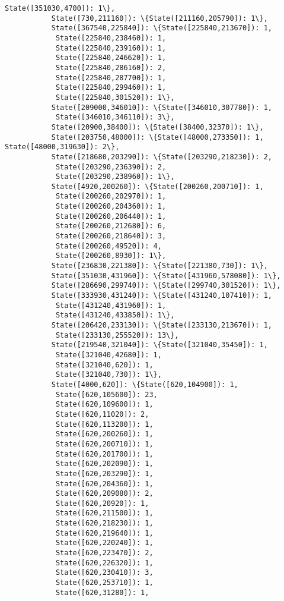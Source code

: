 \documentclass[11pt]{article}
\begin{document}
\begin{Verbatim}[commandchars=\\\{\}]
            State([351030,4700]): 1\},
           State([730,211160]): \{State([211160,205790]): 1\},
           State([367540,225840]): \{State([225840,213670]): 1,
            State([225840,238460]): 1,
            State([225840,239160]): 1,
            State([225840,246620]): 1,
            State([225840,286160]): 2,
            State([225840,287700]): 1,
            State([225840,299460]): 1,
            State([225840,301520]): 1\},
           State([209000,346010]): \{State([346010,307780]): 1,
            State([346010,346110]): 3\},
           State([20900,38400]): \{State([38400,32370]): 1\},
           State([203750,48000]): \{State([48000,273350]): 1, State([48000,319630]): 2\},
           State([218680,203290]): \{State([203290,218230]): 2,
            State([203290,236390]): 2,
            State([203290,238960]): 1\},
           State([4920,200260]): \{State([200260,200710]): 1,
            State([200260,202970]): 1,
            State([200260,204360]): 1,
            State([200260,206440]): 1,
            State([200260,212680]): 6,
            State([200260,218640]): 3,
            State([200260,49520]): 4,
            State([200260,8930]): 1\},
           State([236830,221380]): \{State([221380,730]): 1\},
           State([351030,431960]): \{State([431960,578080]): 1\},
           State([286690,299740]): \{State([299740,301520]): 1\},
           State([333930,431240]): \{State([431240,107410]): 1,
            State([431240,431960]): 1,
            State([431240,433850]): 1\},
           State([206420,233130]): \{State([233130,213670]): 1,
            State([233130,255520]): 13\},
           State([219540,321040]): \{State([321040,35450]): 1,
            State([321040,42680]): 1,
            State([321040,620]): 1,
            State([321040,730]): 1\},
           State([4000,620]): \{State([620,104900]): 1,
            State([620,105600]): 23,
            State([620,109600]): 1,
            State([620,11020]): 2,
            State([620,113200]): 1,
            State([620,200260]): 1,
            State([620,200710]): 1,
            State([620,201700]): 1,
            State([620,202090]): 1,
            State([620,203290]): 1,
            State([620,204360]): 1,
            State([620,209080]): 2,
            State([620,20920]): 1,
            State([620,211500]): 1,
            State([620,218230]): 1,
            State([620,219640]): 1,
            State([620,220240]): 1,
            State([620,223470]): 2,
            State([620,226320]): 1,
            State([620,230410]): 3,
            State([620,253710]): 1,
            State([620,31280]): 1,

\end{Verbatim}
\end{document}
